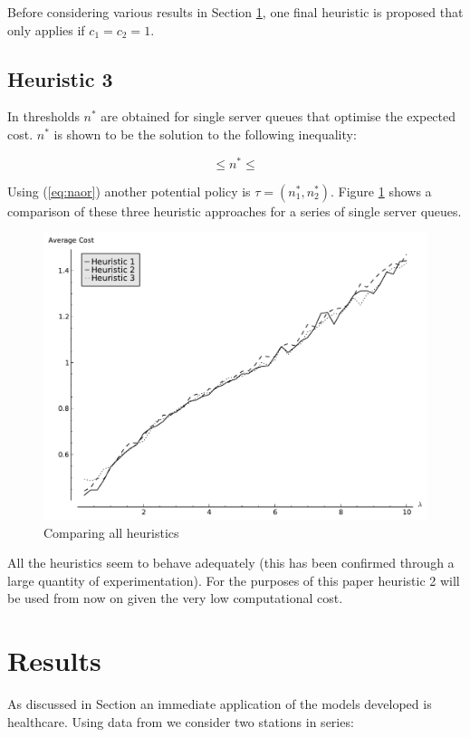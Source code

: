 \documentclass[12pt]{article}
\begin{document}
Before considering various results in Section \ref{results}, one final heuristic is proposed that only applies if $c_1=c_2=1$.

\subsection{Heuristic 3}\label{heuristic3}

In \cite{Naor} thresholds $n^*$ are obtained for single server queues that optimise the expected cost. $n^*$ is shown to be the solution to the following inequality:

\begin{equation}\label{eq:naor}
  \leq  n ^ * \leq
\end{equation}

Using (\ref{eq:naor}) another potential policy is $\tau = (n^*_1, n^*_2)$.
Figure \ref{allheuristics} shows a comparison of these three heuristic approaches for a series of single server queues.

\begin{figure}[!hbtp]
    \begin{center}
        \includegraphics[width=.6\textwidth]{Images/Exit0.pdf}
    \end{center}
    \caption{Comparing all heuristics}\label{allheuristics}
\end{figure}

All the heuristics seem to behave adequately (this has been confirmed through a large quantity of experimentation).
For the purposes of this paper heuristic 2 will be used from now on given the very low computational cost.

\section{Results}\label{results}

As discussed in Section \label{introduction} an immediate application of the models developed is healthcare.
Using data from \cite{} we consider two stations in series:
\end{document}
